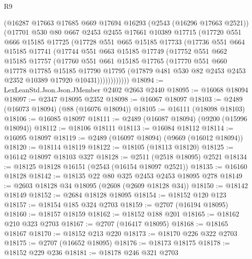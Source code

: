 \begin{lexlean}{R9}
\begin{coremodule}
        (@16287
          @17663
          @17685
          @669
          @17694
          @16293
          (@2543 (@16296 @17663 @2521))
          (@17701
            @530
            @80
            @667
            @2453
            @2455
            @17661
            @10389
            @17715
            (@17720
              @551
              @666
              @15185
              @17725
              (@17728
                @551
                @665
                @15185
                @17733
                (@17736
                  @551
                  @664
                  @15185
                  @17741
                  (@17744
                    @551
                    @663
                    @15185
                    @17749
                    (@17752
                      @551
                      @662
                      @15185
                      @17757
                      (@17760
                        @551
                        @661
                        @15185
                        @17765
                        (@17770
                          @551
                          @660
                          @17778
                          @17785
                          @15185
                          @17790
                          @17795
                          (@17879 @481 @530 @82 @2453 @2453 @2352 @10389 @17920 @10431))))))))))))
@18094 := LexLeanStd.Json.Json.JMember @2402 @2663 @2440
@18095 := @16068 @18094
@18097 := @2347 @18095 @2352
@18098 := @16067 @18097
@18103 := @2489 (@16073 @18094) (@88 (@16076 @18094))
@18105 := @16111 (@18098 @18103)
@18106 := @16085 @18097
@18111 := @2489 (@16087 @18094) (@9200 (@15996 @18094))
@18112 := @18106 @18111
@18113 := @16084 @18112
@18114 := @16095 @18097
@18119 := @2489 (@16097 @18094) (@9669 (@16012 @18094))
@18120 := @18114 @18119
@18122 := @18105 (@18113 @18120)
@18125 := @16142 @18097 @18103 @327
@18128 := @2511 (@2518 @18095) @2521
@18134 := @18125 @18128 @16151 (@2543 (@16154 @18097 @2521))
@18135 := @16160 @18128
@18142 := @18135 @22 @80 @325 @2453 @2453 @18095 @278
@18149 := @2603 @18128 @34 @18095 (@2608 (@2609 @18128 @34))
@18150 := @18142 @18149
@18152 := @2684 @18128 @18095
@18154 := @18152 @120 @123
@18157 := @18154 @185 @324 @2703
@18159 := @2707 (@16194 @18095)
@18160 := @18157 @18159
@18162 := @18152 @188 @201
@18165 := @18162 @210 @323 @2703
@18167 := @2707 (@16417 @18095)
@18168 := @18165 @18167
@18170 := @18152 @213 @220
@18173 := @18170 @226 @322 @2703
@18175 := @2707 (@16652 @18095)
@18176 := @18173 @18175
@18178 := @18152 @229 @236
@18181 := @18178 @246 @321 @2703

\end{coremodule}
\end{lexlean}
